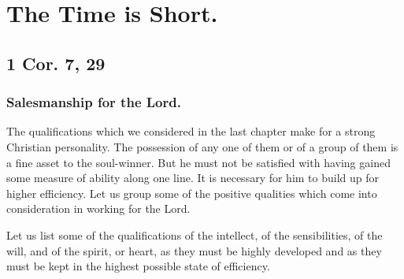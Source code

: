 \documentclass[
]{book}
\begin{document}
\hypertarget{the-time-is-short.}{%
\chapter{The Time is Short.}\label{the-time-is-short.}}

\hypertarget{cor.-7-29}{%
\section*{1 Cor. 7, 29}\label{cor.-7-29}}

\hypertarget{salesmanship-for-the-lord.}{%
\subsection*{Salesmanship for the Lord.}\label{salesmanship-for-the-lord.}}

The qualifications which we considered in the last chapter make for a strong Christian personality. The possession of any one of them or of a group of them is a fine asset to the soul-winner. But he must not be satisfied with having gained some measure of ability along one line. It is necessary for him to build up for higher efficiency. Let us group some of the positive qualities which come into consideration in working for the Lord.

Let us list some of the qualifications of the intellect, of the sensibilities, of the will, and of the spirit, or heart, as they must be highly developed and as they must be kept in the highest possible state of efficiency.
\end{document}
